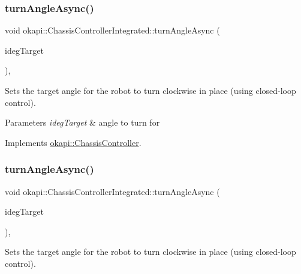 \subsubsection{\texorpdfstring{turnAngleAsync()}{turnAngleAsync()}\hspace{0.1cm}{\footnotesize\ttfamily [1/2]}}
{\footnotesize\ttfamily void okapi\+::\+Chassis\+Controller\+Integrated\+::turn\+Angle\+Async (\begin{DoxyParamCaption}\item[{Q\+Angle}]{ideg\+Target }\end{DoxyParamCaption})\hspace{0.3cm}{\ttfamily [override]}, {\ttfamily [virtual]}}

Sets the target angle for the robot to turn clockwise in place (using closed-\/loop control).


\begin{DoxyParams}{Parameters}
{\em ideg\+Target} & angle to turn for \\
\hline
\end{DoxyParams}


Implements \mbox{\hyperlink{classokapi_1_1ChassisController_a87fc1f88bf06340d8f022a8c185b5e87}{okapi\+::\+Chassis\+Controller}}.

\mbox{\label{classokapi_1_1ChassisControllerIntegrated_abd638be1352919fb211e9b70c181d940}} 
\subsubsection{\texorpdfstring{turnAngleAsync()}{turnAngleAsync()}\hspace{0.1cm}{\footnotesize\ttfamily [2/2]}}
{\footnotesize\ttfamily void okapi\+::\+Chassis\+Controller\+Integrated\+::turn\+Angle\+Async (\begin{DoxyParamCaption}\item[{double}]{ideg\+Target }\end{DoxyParamCaption})\hspace{0.3cm}{\ttfamily [override]}, {\ttfamily [virtual]}}

Sets the target angle for the robot to turn clockwise in place (using closed-\/loop control).


